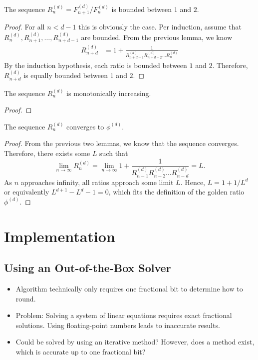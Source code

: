 \documentclass[english,version-2020-11]{uzl-thesis}
\begin{document}
\begin{lemma}
  The sequence $R^{(d)}_n = F^{(d)}_{n+1} / F^{(d)}_{n}$ is bounded between $1$ and $2$.
\end{lemma}

\begin{proof}
  For all $n < d - 1$ this is obviously the case.
  Per induction, assume that $R^{(d)}_n, R^{(d)}_{n+1}, \dots, R^{(d)}_{n+d-1}$ are bounded.
  From the previous lemma, we know
  \begin{align*}
    R^{(d)}_{n+d}
    & = 1 + \frac{1}{R^{(d)}_{n+d-1} R^{(d)}_{n+d-2} \dots R^{(d)}_n}
  \end{align*}
  By the induction hypothesis, each ratio is bounded between $1$ and $2$.
  Therefore, $R^{(d)}_{n+d}$ is equally bounded between $1$ and $2$.
\end{proof}

\begin{lemma}
  The sequence $R^{(d)}_n$ is monotonically increasing.
\end{lemma}

\begin{proof}

\end{proof}

\begin{theorem}
  The sequence $R^{(d)}_n$ converges to $\phi^{(d)}$.
\end{theorem}

\begin{proof}
  From the previous two lemmas, we know that the sequence converges.
  Therefore, there exists some $L$ such that
  \[
    \lim_{n \to \infty} R^{(d)}_n = \lim_{n \to \infty} 1 + \frac{1}{R^{(d)}_{n-1} R^{(d)}_{n-2} \dots R^{(d)}_{n-d}} = L.
  \]
  As $n$ approaches infinity, all ratios approach some limit $L$.
  Hence, $L = 1 + 1/L^d$ or equivalently $L^{d+1} - L^d - 1 = 0$,
  which fits the definition of the golden ratio $\phi^{(d)}$.
\end{proof}

\chapter{Implementation}

\section{Using an Out-of-the-Box Solver}

\begin{itemize}
  \item Algorithm technically only requires one fractional bit to determine how to round.
  \item Problem: Solving a system of linear equations requires exact fractional solutions.
    Using floating-point numbers leads to inaccurate results.
  \item Could be solved by using an iterative method? However, does a method
    exist, which is accurate up to one fractional bit?
\end{itemize}
\end{document}
